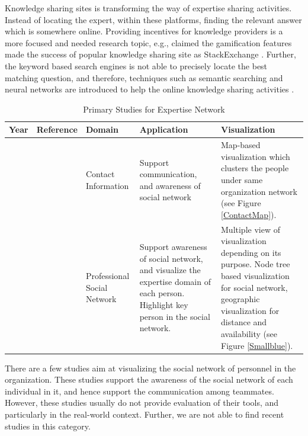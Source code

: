Knowledge sharing sites is transforming the way of expertise sharing activities. Instead of locating the expert, within these platforms, finding the relevant answer which is somewhere online. Providing incentives for knowledge providers is a more focused and needed research topic, e.g., \citeauthor{vasilescu2014social} claimed the gamification features made the success of popular knowledge sharing site as StackExchange \cite{vasilescu2014social}. Further, the keyword based search engines is not able to precisely locate the best matching question, and therefore, techniques such as semantic searching and neural networks are introduced to help the online knowledge sharing activities \cite{gottipati2011finding, xu2016predicting}.

\begin{table}[htbp]
\centering
\footnotesize
\settowidth{}
\begin{tabulary}{\textwidth}{LLLLL}
\hline
\textbf{Year}           & \textbf{Reference}          & \textbf{Domain}  &\textbf{Application}  & \textbf{Visualization} \\ \hline
\citeyear{nardi2002integrating} & \citeauthor{nardi2002integrating}\cite{nardi2002integrating} & Contact Information & Support communication, and awareness of social network & Map-based visualization which clusters the people under same organization network (see Figure \ref{ContactMap}). \\\hline
\citeyear{lin2009smallblue} & \citeauthor{lin2009smallblue}\cite{lin2009smallblue} & Professional Social Network & Support awareness of social network, and visualize the expertise domain of each person. Highlight key person in the social network. & Multiple view of visualization depending on its purpose. Node tree based visualization for social network, geographic visualization for distance and availability (see Figure \ref{Smallblue}).\\
\hline
\end{tabulary}
\caption{Primary Studies for Expertise Network}
\label{tab:network}
\end{table}

There are a few studies aim at visualizing the social network of personnel in the organization. These studies support the awareness of the social network of each individual in it, and hence support the communication among teammates. However, these studies usually do not provide evaluation of their tools, and particularly in the real-world context. Further, we are not able to find recent studies in this category.

